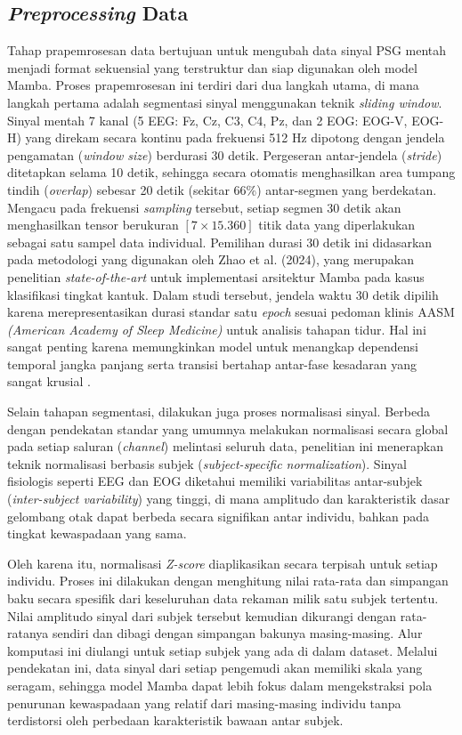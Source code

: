 \subsection{\textit{Preprocessing} Data} \label{III.Langkah5}

Tahap prapemrosesan data bertujuan untuk mengubah data sinyal PSG mentah menjadi format sekuensial yang terstruktur dan siap digunakan oleh model Mamba. Proses prapemrosesan ini terdiri dari dua langkah utama, di mana langkah pertama adalah segmentasi sinyal menggunakan teknik \textit{sliding window}. Sinyal mentah 7 kanal (5 EEG: Fz, Cz, C3, C4, Pz, dan 2 EOG: EOG-V, EOG-H) yang direkam secara kontinu pada frekuensi 512 Hz dipotong dengan jendela pengamatan (\textit{window size}) berdurasi 30 detik. Pergeseran antar-jendela (\textit{stride}) ditetapkan selama 10 detik, sehingga secara otomatis menghasilkan area tumpang tindih (\textit{overlap}) sebesar 20 detik (sekitar 66\%) antar-segmen yang berdekatan. Mengacu pada frekuensi \textit{sampling} tersebut, setiap segmen 30 detik akan menghasilkan tensor berukuran $[7 \times 15.360]$ titik data yang diperlakukan sebagai satu sampel data individual. Pemilihan durasi 30 detik ini didasarkan pada metodologi yang digunakan oleh Zhao et al. (2024), yang merupakan penelitian \textit{state-of-the-art} untuk implementasi arsitektur Mamba pada kasus klasifikasi tingkat kantuk. Dalam studi tersebut, jendela waktu 30 detik dipilih karena merepresentasikan durasi standar satu \textit{epoch} sesuai pedoman klinis AASM \textit{(American Academy of Sleep Medicine)} untuk analisis tahapan tidur. Hal ini sangat penting karena memungkinkan model untuk menangkap dependensi temporal jangka panjang serta transisi bertahap antar-fase kesadaran yang sangat krusial \cite{Zhou2024Sleep}.

Selain tahapan segmentasi, dilakukan juga proses normalisasi sinyal. Berbeda dengan pendekatan standar yang umumnya melakukan normalisasi secara global pada setiap saluran (\textit{channel}) melintasi seluruh data, penelitian ini menerapkan teknik normalisasi berbasis subjek (\textit{subject-specific normalization}). Sinyal fisiologis seperti EEG dan EOG diketahui memiliki variabilitas antar-subjek (\textit{inter-subject variability}) yang tinggi, di mana amplitudo dan karakteristik dasar gelombang otak dapat berbeda secara signifikan antar individu, bahkan pada tingkat kewaspadaan yang sama. 

Oleh karena itu, normalisasi \textit{Z-score} diaplikasikan secara terpisah untuk setiap individu. Proses ini dilakukan dengan menghitung nilai rata-rata dan simpangan baku secara spesifik dari keseluruhan data rekaman milik satu subjek tertentu. Nilai amplitudo sinyal dari subjek tersebut kemudian dikurangi dengan rata-ratanya sendiri dan dibagi dengan simpangan bakunya masing-masing. Alur komputasi ini diulangi untuk setiap subjek yang ada di dalam dataset. Melalui pendekatan ini, data sinyal dari setiap pengemudi akan memiliki skala yang seragam, sehingga model Mamba dapat lebih fokus dalam mengekstraksi pola penurunan kewaspadaan yang relatif dari masing-masing individu tanpa terdistorsi oleh perbedaan karakteristik bawaan antar subjek.

